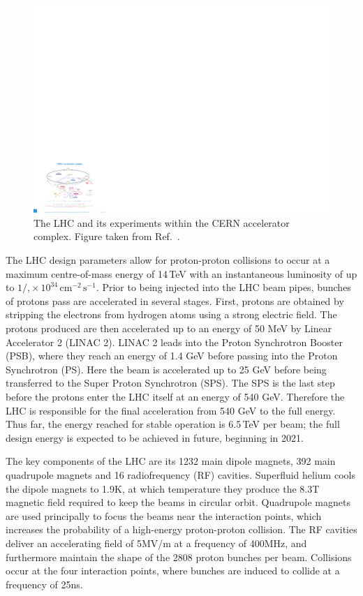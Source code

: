 \begin{figure}[h!]
  \centering
  \includegraphics[width=\textwidth]{Figures/Detector/CERNschematic.pdf}
  \caption[The CERN accelerator complex.]
  {The LHC and its experiments within the CERN accelerator complex.
  Figure taken from Ref.~\cite{CERNcomplex}.}
  \label{fig:detector_CERNschematic}
\end{figure}

The LHC design parameters allow for proton-proton collisions to occur at a maximum centre-of-mass energy of 14\,TeV 
with an instantaneous luminosity of up to $1/,\times\,10^{34}\,\textrm{cm}^{-2}\,\textrm{s}^{-1}$.
Prior to being injected into the LHC beam pipes, bunches of protons pass are accelerated in several stages. 
First, protons are obtained by stripping the electrons from hydrogen atoms using a strong electric field.
The protons produced are then accelerated up to an energy of 50 MeV by Linear Accelerator 2 (LINAC 2).
LINAC 2 leads into the Proton Synchrotron Booster (PSB), where they reach an energy of 1.4 GeV before passing into the Proton Synchrotron (PS).
Here the beam is accelerated up to 25 GeV before being transferred to the Super Proton Synchrotron (SPS).
The SPS is the last step before the protons enter the LHC itself at an energy of 540 GeV.
Therefore the LHC is responsible for the final acceleration from 540 GeV to the full energy.
Thus far, the energy reached for stable operation is 6.5\,TeV per beam; 
the full design energy is expected to be achieved in future, beginning in 2021.

The key components of the LHC are its 1232 main dipole magnets, 392 main quadrupole magnets and 16 radiofrequency (RF) cavities.
Superfluid helium cools the dipole magnets to 1.9K, at which temperature they produce the 8.3T magnetic field required to keep the beams in circular orbit.
Quadrupole magnets are used principally to focus the beams near the interaction points, which increases the probability of a high-energy proton-proton collision.
The RF cavities deliver an accelerating field of 5MV/m at a frequency of 400MHz, and furthermore maintain the shape of the 2808 proton bunches per beam.
Collisions occur at the four interaction points, where bunches are induced to collide at a frequency of 25ns. 

